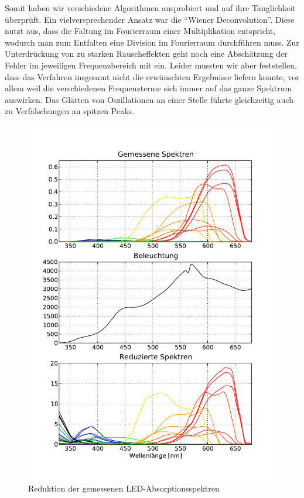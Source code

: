 \documentclass[11pt]{scrartcl}
\begin{document}
Somit haben wir verschiedene Algorithmen ausprobiert und auf ihre Tauglichkeit überprüft.
Ein vielversprechender Ansatz war die "`Wiener Deconvolution"'.
Diese nutzt aus, dass die Faltung im Fourierraum einer Multiplikation entspricht, wodurch man zum Entfalten eine Division im Fourierraum durchführen muss.
Zur Unterdrückung von zu starken Rauscheffekten geht noch eine Abschätzung der Fehler im jeweiligen Frequenzbereich mit ein.
Leider mussten wir aber feststellen, dass das Verfahren insgesamt nicht die erwünschten Ergebnisse liefern konnte, vor allem weil die verschiedenen Frequenzterme sich immer auf das ganze Spektrum auswirken.
Das Glätten von Oszillationen an einer Stelle führte gleichzeitig auch zu Verfälschungen an spitzen Peaks.

\begin{figure}[H]
\begin{center}
\includegraphics[width=1\textwidth]{images/spektren_mit_halogen.pdf}
\end{center}
\vspace{-1.5\baselineskip}
\caption{Reduktion der gemessenen LED-Absorptionsspektren}
\label{fig:reduktion}
\end{figure}
\end{document}
